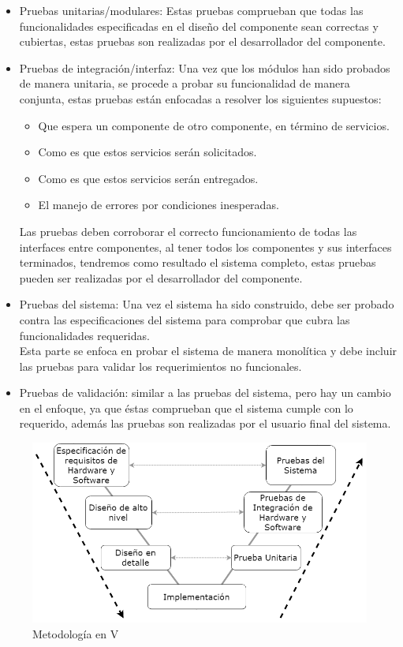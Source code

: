 \begin{itemize}

    \item Pruebas unitarias/modulares: Estas pruebas comprueban que todas las funcionalidades especificadas en el diseño del componente sean correctas y cubiertas, estas pruebas son realizadas por el desarrollador del componente.
    
    \item Pruebas de integración/interfaz: Una vez que los módulos han sido probados de manera unitaria, se procede a probar su funcionalidad de manera conjunta, estas pruebas están enfocadas a resolver los siguientes supuestos:
    
    \begin{itemize}
        \item Que espera un componente de otro componente, en término de servicios.
        \item Como es que estos servicios serán solicitados.
        \item Como es que estos servicios serán entregados.
        \item El manejo de errores por condiciones inesperadas.
    \end{itemize}
    
    Las pruebas deben corroborar el correcto funcionamiento de todas las interfaces entre componentes, al tener todos los componentes y sus interfaces terminados, tendremos como resultado el sistema completo, estas pruebas pueden ser realizadas por el desarrollador del componente.
    
    \item Pruebas del sistema: Una vez el sistema ha sido construido, debe ser probado contra las especificaciones del sistema para comprobar que cubra las funcionalidades requeridas.\\
    Esta parte se enfoca en probar el sistema de manera monolítica y debe incluir las pruebas para validar los requerimientos no funcionales.

    \item Pruebas de validación: similar a las pruebas del sistema, pero hay un cambio en el enfoque, ya que éstas comprueban que el sistema cumple con lo requerido, además las pruebas son realizadas por el usuario final del sistema.

\end{itemize}

\begin{figure}[H]
	\centering
	\includegraphics[scale=.6]{Capitulo3/img/vmodel.png}
	\caption{Metodología en V}
	\label{fig:ModeloIncremental}
\end{figure}


